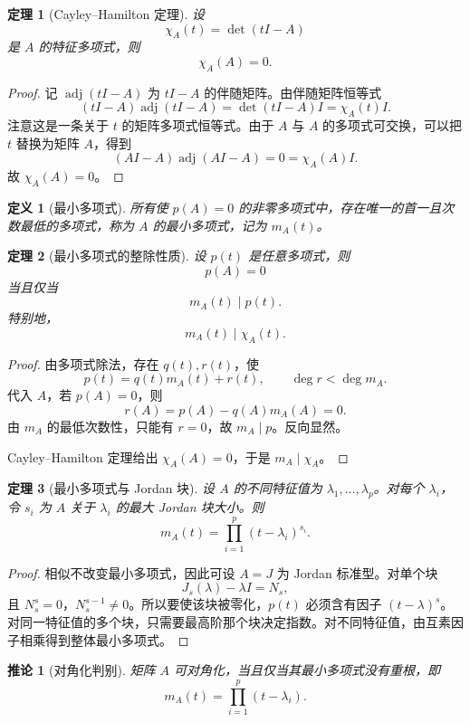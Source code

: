 \documentclass[UTF8,openany,zihao=-4]{ctexbook}
\theoremstyle{cnplain}
\newtheorem{definition}{定义}[chapter]
\newtheorem{theorem}{定理}[chapter]
\newtheorem{corollary}{推论}[chapter]
\begin{document}
\begin{theorem}[Cayley--Hamilton 定理]
设
\[
\chi_A(t)=\det(tI-A)
\]
是 $A$ 的特征多项式，则
\[
\chi_A(A)=0.
\]
\end{theorem}

\begin{proof}
记 $\operatorname{adj}(tI-A)$ 为 $tI-A$ 的伴随矩阵。由伴随矩阵恒等式
\[
(tI-A)\operatorname{adj}(tI-A)=\det(tI-A)I=\chi_A(t)I.
\]
注意这是一条关于 $t$ 的矩阵多项式恒等式。由于 $A$ 与 $A$ 的多项式可交换，可以把 $t$ 替换为矩阵 $A$，得到
\[
(AI-A)\operatorname{adj}(AI-A)=0=\chi_A(A)I.
\]
故 $\chi_A(A)=0$。
\end{proof}

\begin{definition}[最小多项式]
所有使 $p(A)=0$ 的非零多项式中，存在唯一的首一且次数最低的多项式，称为 $A$ 的最小多项式，记为 $m_A(t)$。
\end{definition}

\begin{theorem}[最小多项式的整除性质]
设 $p(t)$ 是任意多项式，则
\[
p(A)=0
\]
当且仅当
\[
m_A(t)\mid p(t).
\]
特别地，
\[
m_A(t)\mid \chi_A(t).
\]
\end{theorem}

\begin{proof}
由多项式除法，存在 $q(t),r(t)$，使
\[
p(t)=q(t)m_A(t)+r(t),
\qquad \deg r<\deg m_A.
\]
代入 $A$，若 $p(A)=0$，则
\[
r(A)=p(A)-q(A)m_A(A)=0.
\]
由 $m_A$ 的最低次数性，只能有 $r=0$，故 $m_A\mid p$。反向显然。

Cayley--Hamilton 定理给出 $\chi_A(A)=0$，于是 $m_A\mid\chi_A$。
\end{proof}

\begin{theorem}[最小多项式与 Jordan 块]
设 $A$ 的不同特征值为 $\lambda_1,
\ldots,\lambda_p$。对每个 $\lambda_i$，令 $s_i$ 为 $A$ 关于 $\lambda_i$ 的最大 Jordan 块大小。则
\[
m_A(t)=\prod_{i=1}^p (t-\lambda_i)^{s_i}.
\]
\end{theorem}

\begin{proof}
相似不改变最小多项式，因此可设 $A=J$ 为 Jordan 标准型。对单个块
\[
J_s(\lambda)-\lambda I=N_s,
\]
且 $N_s^s=0$，$N_s^{s-1}\ne0$。所以要使该块被零化，$p(t)$ 必须含有因子 $(t-\lambda)^s$。对同一特征值的多个块，只需要最高阶那个块决定指数。对不同特征值，由互素因子相乘得到整体最小多项式。
\end{proof}

\begin{corollary}[对角化判别]
矩阵 $A$ 可对角化，当且仅当其最小多项式没有重根，即
\[
m_A(t)=\prod_{i=1}^p(t-\lambda_i).
\]
\end{corollary}
\end{document}
